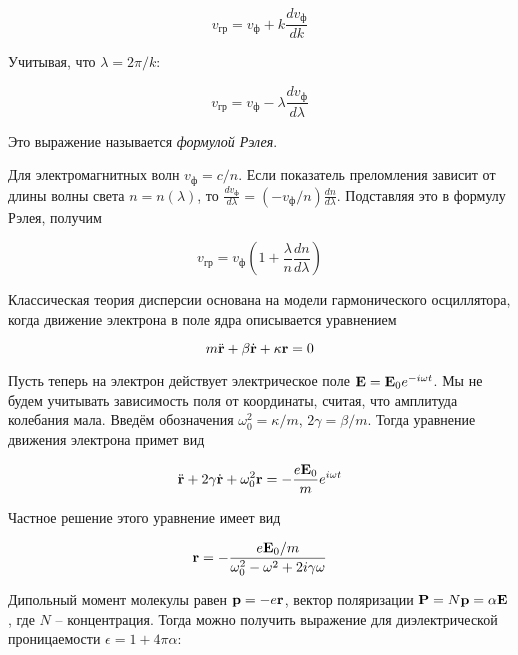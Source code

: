 \begin{equation}
    v_\text{гр} = v_\text{ф} + k \frac{d v_\text{ф}}{d k}
\end{equation}

\noindent
Учитывая, что $\lambda = 2 \pi / k$:

\begin{equation}
    v_\text{гр} = v_\text{ф} - \lambda \frac{d v_\text{ф}}{d \lambda}
\end{equation}

\noindent
Это выражение называется \textit{формулой Рэлея}.

Для электромагнитных волн $v_\text{ф} = c / n$. Если показатель преломления зависит от длины волны света $n = n(\lambda)$, то $\frac{d v_\text{ф}}{d \lambda} = \left( - v_\text{ф} / n \right) \frac{d n}{d \lambda}$. Подставляя это в формулу Рэлея, получим

\begin{equation}
    v_\text{гр} = v_\text{ф} \left( 1 + \frac{\lambda}{n} \frac{d n}{d \lambda} \right)
\end{equation}

Классическая теория дисперсии основана на модели гармонического осциллятора, когда движение электрона в поле ядра описывается уравнением

\begin{equation}
    m \ddot{\mathbf r} + \beta \dot{\mathbf r} + \kappa \mathbf r = 0
\end{equation}

Пусть теперь на электрон действует электрическое поле $\mathbf E = \mathbf E_0 e^{- i \omega t}$. Мы не будем учитывать зависимость поля от координаты, считая, что амплитуда колебания мала. Введём обозначения $\omega_0^2 = \kappa / m$, $2 \gamma = \beta / m$. Тогда уравнение движения электрона примет вид

\begin{equation}
    \ddot{\mathbf r} + 2 \gamma \dot{\mathbf r} + \omega_0^2 \mathbf r = - \frac{e \mathbf E_0}{m} e^{ i \omega t}
\end{equation}

\noindent
Частное решение этого уравнение имеет вид

\begin{equation}
    \mathbf r = - \frac{e \mathbf E_0 / m}{\omega_0^2 - \omega^2 + 2 i \gamma \omega}
\end{equation}

Дипольный момент молекулы равен $\mathbf p = - e \mathbf r$, вектор поляризации $\mathbf P = N \mathbf p = \alpha \mathbf E$, где $N$ -- концентрация. Тогда можно получить выражение для диэлектрической проницаемости $\epsilon = 1 + 4 \pi \alpha$:

